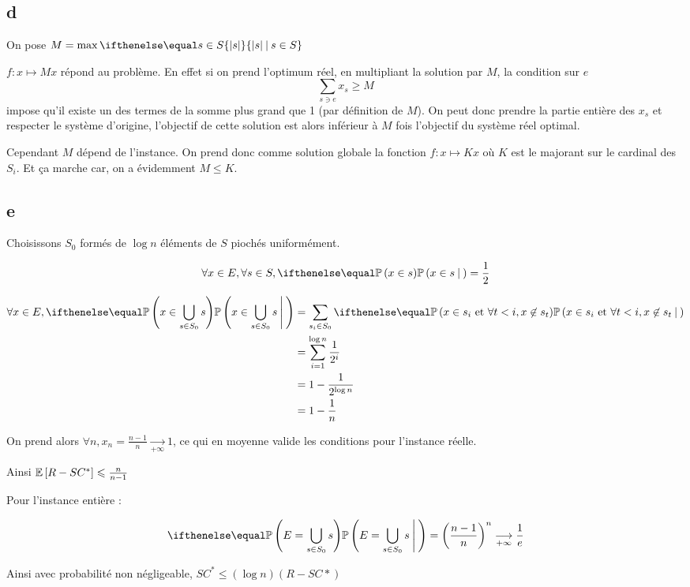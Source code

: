 \subsection*{d}
 
On pose $M=\max\set{|s|}{s\in S}$

$f : x\mapsto Mx$ répond au problème. En effet si on prend l'optimum réel, en multipliant la solution par $M$, la condition sur $e$
\[
    \sum\limits_{s \ni e} x_s \geqslant M
\]
impose qu'il existe un des termes de la somme plus grand que 1 (par définition de $M$). On peut donc prendre la partie entière des $x_s$ et respecter le système d'origine, l'objectif de cette solution est alors inférieur à $M$ fois l'objectif du système réel optimal.

Cependant $M$ dépend de l'instance. On prend donc comme solution globale la fonction $f:x\mapsto Kx$ où $K$ est le majorant sur le cardinal des $S_i$. Et ça marche car, on a évidemment $M\leqslant K$.

\subsection*{e}


Choisissons $S_0$ formés de $\log n$ éléments de $S$ piochés uniformément.

\[
    \forall x \in E, \forall s \in S, \proba{x \in s}{}=\frac{1}{2}
\]

\[
    \begin{aligned}
        \forall x \in E, \proba{x \in \bigcup\limits_{s\in S_0} s}{} &= \sum_{s_i \in S_0}\proba{x \in s_i \text{ et } \forall t<i, x \not\in s_t }{}\\
        &= \sum_{i=1}^{\log n}{\frac{1}{2^i}}\\
        &= 1-\frac{1}{2^{\log n}}\\
        &= 1-\frac{1}{n}\\
    \end{aligned}
\]

On prend alors $\forall n, x_n=\frac{n-1}{n}\underset{+\infty}{\longrightarrow} 1$, ce qui en moyenne valide les conditions pour l'instance réelle.

Ainsi $\mathbb{E}\left[ R-SC^* \right]\leqslant \frac{n}{n-1}$

Pour l'instance entière :

\[
    \proba{E=\bigcup\limits_{s\in S_0} s}{}={\left(\frac{n-1}{n}\right)}^n \underset{+\infty}{\longrightarrow} \frac{1}{e}
\]

Ainsi avec probabilité non négligeable, $SC^* \leqslant (\log n) (R-SC*)$


